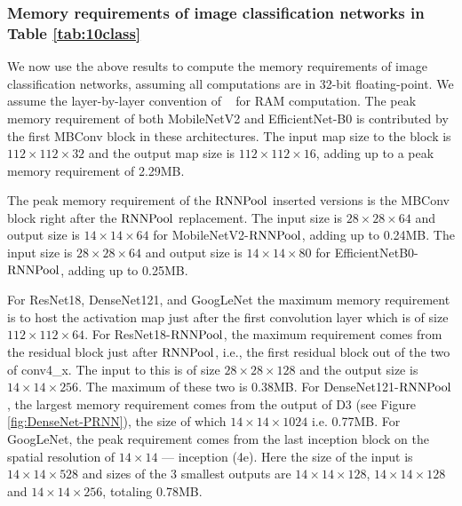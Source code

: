 \documentclass[10pt]{article}
\newcommand{\rpool}{\ensuremath{{\rm RNNPool}}\xspace}
\begin{document}
\subsubsection{Memory requirements of image classification networks in Table \ref{tab:10class}}
\label{sec:ramcalculation10class}
We now use the above results to compute the memory requirements of
image classification networks, assuming all computations are in 32-bit
floating-point. We assume the layer-by-layer convention of
~\cite{chowdhery2019visual} for RAM computation.  The peak memory
requirement of both MobileNetV2 and EfficientNet-B0 is contributed by
the first MBConv block in these architectures. The input map size to
the block is $112 \times 112 \times 32$ and the output map size is $112
\times 112 \times 16$, adding up to a peak memory requirement of 2.29MB.

The peak memory requirement of the \rpool inserted versions is the
MBConv block right after the \rpool replacement. The input size is $28
\times 28 \times 64$ and output size is $14 \times 14 \times 64$ for
MobileNetV2-\rpool, adding up to 0.24MB. The input size is $28 \times
28 \times 64$ and output size is $14 \times 14 \times 80$ for
EfficientNetB0-\rpool, adding up to 0.25MB.

For ResNet18, DenseNet121, and GoogLeNet the maximum memory requirement
is to host the activation map just after the first convolution layer
which is of size $112 \times 112 \times 64$.  For ResNet18-\rpool, the
maximum requirement comes from the residual block just after \rpool,
i.e., the first residual block out of the two of conv4\_x. The input
to this is of size $28 \times 28 \times 128$ and the output size is $14
\times 14 \times 256$. The maximum of these two is 0.38MB. For
DenseNet121-\rpool, the largest memory requirement comes from the
output of D3 (see Figure \ref{fig:DenseNet-PRNN}), the size of which
$14 \times 14 \times 1024$ i.e. 0.77MB. For GoogLeNet, the peak
requirement comes from the last inception block on the spatial resolution
of $14 \times 14$ --- inception (4e).  Here the size of the input is $14
\times 14 \times 528$ and sizes of the 3 smallest outputs are $14
\times 14 \times 128$, $14 \times 14 \times 128$ and $14 \times 14
\times 256$, totaling 0.78MB.
\end{document}
